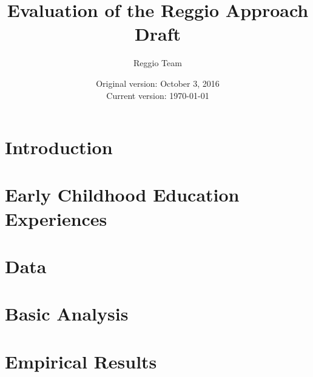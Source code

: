 




\title{\Large \textbf{Evaluation of the Reggio Approach} \\ Draft}
\author{\normalsize Reggio Team}
\date{\normalsize Original version: October 3, 2016 \\ Current version: \today}
\maketitle

\tableofcontents

\doublespacing

\section{Introduction}
\label{sec:introduction}


\section{Early Childhood Education Experiences}
\label{sec:eceexperiences}


\section{Data}
\label{sec:data}


\section{Basic Analysis}
\label{sec:methodology}


\section{Empirical Results}
\label{sec:results}


%

\clearpage




\clearpage
\begin{appendices}
\label{sec:Appendix}

\end{appendices}


